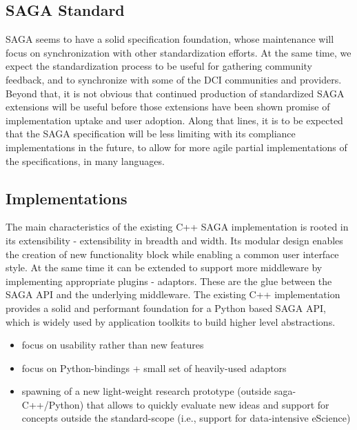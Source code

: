 \documentclass[]{article}
\newcommand{\B}[1]{\textbf{#1}}
\newcommand{\hknote}[1]{{\textcolor{red}{  \B{Hartmut: } #1 }}}
\newcommand{\hknote}[1]{}
\begin{document}
 \subsection{SAGA Standard}

  SAGA seems to have a solid specification foundation, whose
  maintenance will focus on synchronization with other
  standardization efforts.  At the same time, we expect the
  standardization process to be useful for gathering community
  feedback, and to synchronize with some of the DCI communities and
  providers.  Beyond that, it is not obvious that continued production
  of standardized SAGA extensions will be useful before those
  extensions have been shown promise of implementation uptake and user
  adoption.  Along that lines, it is to be expected that the SAGA
  specification will be less limiting with its compliance
  implementations in the future, to allow for more agile partial
  implementations of the specifications, in many languages.


 \subsection{Implementations}

  The main characteristics of the existing C++ SAGA implementation is
  rooted in its extensibility - extensibility in breadth and width.
  Its modular design enables the creation of new functionality block
  while enabling a common user interface style.  At the same time it
  can be extended to support more middleware by implementing
  appropriate plugins - adaptors. These are the glue between the SAGA
  API and the underlying middleware. The existing C++ implementation
  provides a solid and performant foundation for a Python based SAGA
  API, which is widely used by application toolkits to build higher
  level abstractions.

  \begin{itemize}
   \item focus on usability rather than new features
   \item focus on Python-bindings + small set of heavily-used adaptors
   \item spawning of a new light-weight research prototype (outside 
         saga-C++/Python) that allows to quickly evaluate new ideas 
         and support for concepts outside the standard-scope (i.e., 
         support for data-intensive eScience)
  \end{itemize}

\end{document}
